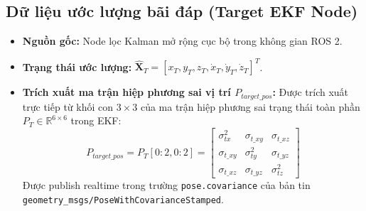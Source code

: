 \documentclass[12pt,a4paper]{article}
\begin{document}
\subsection{Dữ liệu ước lượng bãi đáp (Target EKF Node)}
\begin{itemize}[noitemsep,topsep=2pt]
    \item \textbf{Nguồn gốc:} Node lọc Kalman mở rộng cục bộ trong không gian ROS 2.
    \item \textbf{Trạng thái ước lượng:} $\hat{\mathbf{X}}_T = [x_T, y_T, z_T, \dot{x}_T, \dot{y}_T, \dot{z}_T]^T$.
    \item \textbf{Trích xuất ma trận hiệp phương sai vị trí $P_{target\_pos}$:}
    Được trích xuất trực tiếp từ khối con $3 \times 3$ của ma trận hiệp phương sai trạng thái toàn phần $P_T \in \mathbb{R}^{6 \times 6}$ trong EKF:
    \begin{equation}
        P_{target\_pos} = P_T[0:2, 0:2] = \begin{bmatrix}
            \sigma_{tx}^2 & \sigma_{t\_xy} & \sigma_{t\_xz} \\
            \sigma_{t\_xy} & \sigma_{ty}^2 & \sigma_{t\_yz} \\
            \sigma_{t\_xz} & \sigma_{t\_yz} & \sigma_{tz}^2
        \end{bmatrix}
    \end{equation}
    Được publish realtime trong trường \texttt{pose.covariance} của bản tin \texttt{geometry\_msgs/PoseWithCovarianceStamped}.
\end{itemize}
\end{document}
